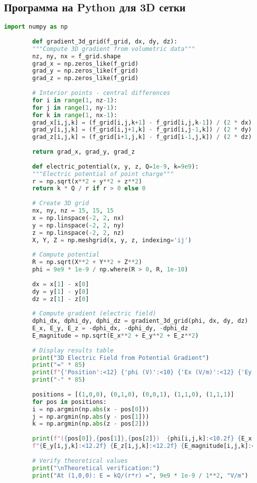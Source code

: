 \documentclass[12pt]{article}
\begin{document}
	\subsection{Программа на Python для 3D сетки}
	
	\begin{lstlisting}[language=Python, caption=3D gradient from grid data (Python)]
		import numpy as np
		
		def gradient_3d_grid(f_grid, dx, dy, dz):
		"""Compute 3D gradient from volumetric data"""
		nz, ny, nx = f_grid.shape
		grad_x = np.zeros_like(f_grid)
		grad_y = np.zeros_like(f_grid)
		grad_z = np.zeros_like(f_grid)
		
		# Interior points - central differences
		for i in range(1, nz-1):
		for j in range(1, ny-1):
		for k in range(1, nx-1):
		grad_x[i,j,k] = (f_grid[i,j,k+1] - f_grid[i,j,k-1]) / (2 * dx)
		grad_y[i,j,k] = (f_grid[i,j+1,k] - f_grid[i,j-1,k]) / (2 * dy)
		grad_z[i,j,k] = (f_grid[i+1,j,k] - f_grid[i-1,j,k]) / (2 * dz)
		
		return grad_x, grad_y, grad_z
		
		def electric_potential(x, y, z, Q=1e-9, k=9e9):
		"""Electric potential of point charge"""
		r = np.sqrt(x**2 + y**2 + z**2)
		return k * Q / r if r > 0 else 0
		
		# Create 3D grid
		nx, ny, nz = 15, 15, 15
		x = np.linspace(-2, 2, nx)
		y = np.linspace(-2, 2, ny)
		z = np.linspace(-2, 2, nz)
		X, Y, Z = np.meshgrid(x, y, z, indexing='ij')
		
		# Compute potential
		R = np.sqrt(X**2 + Y**2 + Z**2)
		phi = 9e9 * 1e-9 / np.where(R > 0, R, 1e-10)
		
		dx = x[1] - x[0]
		dy = y[1] - y[0]
		dz = z[1] - z[0]
		
		# Compute gradient (electric field)
		dphi_dx, dphi_dy, dphi_dz = gradient_3d_grid(phi, dx, dy, dz)
		E_x, E_y, E_z = -dphi_dx, -dphi_dy, -dphi_dz
		E_magnitude = np.sqrt(E_x**2 + E_y**2 + E_z**2)
		
		# Display results table
		print("3D Electric Field from Potential Gradient")
		print("=" * 85)
		print(f"{'Position':<12} {'phi (V)':<10} {'Ex (V/m)':<12} {'Ey (V/m)':<12} {'Ez (V/m)':<12} {'|E| (V/m)':<12}")
		print("-" * 85)
		
		positions = [(1,0,0), (0,1,0), (0,0,1), (1,1,0), (1,1,1)]
		for pos in positions:
		i = np.argmin(np.abs(x - pos[0]))
		j = np.argmin(np.abs(y - pos[1]))
		k = np.argmin(np.abs(z - pos[2]))
		
		print(f"({pos[0]},{pos[1]},{pos[2]})  {phi[i,j,k]:<10.2f} {E_x[i,j,k]:<12.2f} "
		f"{E_y[i,j,k]:<12.2f} {E_z[i,j,k]:<12.2f} {E_magnitude[i,j,k]:<12.2f}")
		
		# Verify theoretical values
		print("\nTheoretical verification:")
		print("At (1,0,0): E = kQ/(r*r) =", 9e9 * 1e-9 / 1**2, "V/m")
	\end{lstlisting}
	
\end{document}
